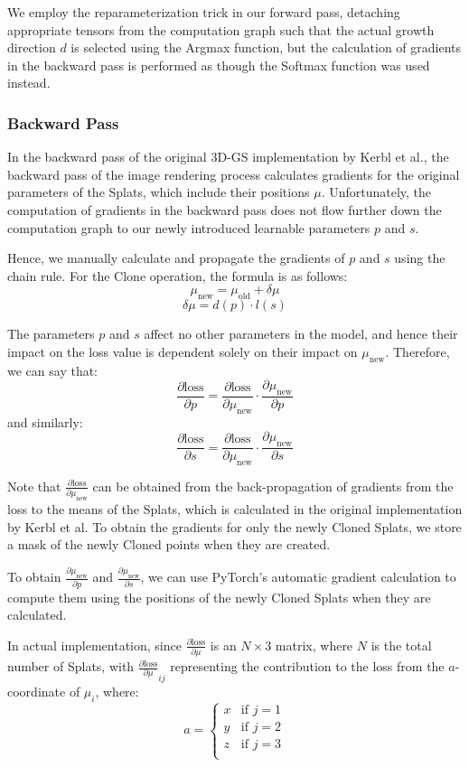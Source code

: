 \documentclass[11pt]{report}
\begin{document}
We employ the reparameterization trick in our forward pass, detaching appropriate tensors from the computation graph such that the actual growth direction $d$ is selected using the Argmax function, but the calculation of gradients in the backward pass is performed as though the Softmax function was used instead.

\subsubsection{Backward Pass}
In the backward pass of the original 3D-GS implementation by Kerbl et al., the backward pass of the image rendering process calculates gradients for the original parameters of the Splats, which include their positions $\mu$. Unfortunately, the computation of gradients in the backward pass does not flow further down the computation graph to our newly introduced learnable parameters $p$ and $s$.

Hence, we manually calculate and propagate the gradients of $p$ and $s$ using the chain rule. For the Clone operation, the formula is as follows:
\[ \mu_{\text{new}} = \mu_{\text{old}} + \delta \mu \]
\[ \delta \mu = d(p) \cdot l(s) \]

The parameters $p$ and $s$ affect no other parameters in the model, and hence their impact on the loss value is dependent solely on their impact on $\mu_{\text{new}}$. Therefore, we can say that:
\[ \frac{\partial \text{loss}}{\partial p} = \frac{\partial \text{loss}}{\partial \mu_{\text{new}}} \cdot \frac{\partial \mu_{\text{new}}}{\partial p} \]
and similarly:
\[ \frac{\partial \text{loss}}{\partial s} = \frac{\partial \text{loss}}{\partial \mu_{\text{new}}} \cdot \frac{\partial \mu_{\text{new}}}{\partial s} \]

Note that $\frac{\partial \text{loss}}{\partial \mu_{\text{new}}}$ can be obtained from the back-propagation of gradients from the loss to the means of the Splats, which is calculated in the original implementation by Kerbl et al. To obtain the gradients for only the newly Cloned Splats, we store a mask of the newly Cloned points when they are created.

To obtain $\frac{\partial \mu_{\text{new}}}{\partial p}$ and $\frac{\partial \mu_{\text{new}}}{\partial s}$, we can use PyTorch's automatic gradient calculation to compute them using the positions of the newly Cloned Splats when they are calculated.

In actual implementation, since $\frac{\partial \text{loss}}{\partial \mu}$ is an $N \times 3$ matrix, where $N$ is the total number of Splats, with $\frac{\partial \text{loss}}{\partial \mu}_{ij}$ representing the contribution to the loss from the $a$-coordinate of $\mu_{i}$, where:
\[ a = \begin{cases}
x & \textrm{if }j=1\\
y & \textrm{if }j=2\\
z & \textrm{if }j=3\\
\end{cases} \]
\end{document}
